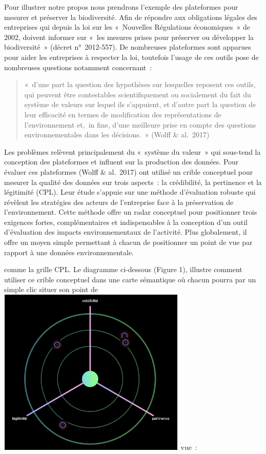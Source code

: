 \documentclass[
  letterpaper,
  DIV=11,
  numbers=noendperiod]{scrreprt}
\begin{document}
Pour illustrer notre propos nous prendrons l'exemple des plateformes
pour mesurer et préserver la biodiversité. Afin de répondre aux
obligations légales des entreprises qui depuis la loi sur les
«~Nouvelles Régulations économiques~» de 2002, doivent informer sur
«~les mesures prises pour préserver ou développer la biodiversité~»
(décret n°~2012-557). De nombreuses plateformes sont apparues pour aider
les entreprises à respecter la loi, toutefois l'usage de ces outils pose
de nombreuses questions notamment concernant~:

\begin{quote}
«~d'une part la question des hypothèses sur lesquelles reposent ces
outils, qui peuvent être contestables scientifiquement ou socialement du
fait du système de valeurs sur lequel ils s'appuient, et d'autre part la
question de leur efficacité en termes de modification des
représentations de l'environnement et,~in fine, d'une meilleure prise en
compte des questions environnementales dans les décisions.~» (Wolff \&
al.~2017)
\end{quote}

Les problèmes relèvent principalement du «~système du valeur~» qui
sous-tend la conception des plateformes et influent sur la production
des données. Pour évaluer ces plateformes (Wolff \& al.~2017) ont
utilisé un crible conceptuel pour mesurer la qualité des données sur
trois aspects~: la crédibilité, la pertinence et la légitimité (CPL).
Leur étude s'appuie sur une méthode d'évaluation robuste qui révèlent
les stratégies des acteurs de l'entreprise face à la préservation de
l'environnement. Cette méthode offre un radar conceptuel pour
positionner trois exigences fortes, complémentaires et indispensables à
la conception d'un outil d'évaluation des impacts environnementaux de
l'activité. Plus globalement, il offre un moyen simple permettant à
chacun de positionner un point de vue par rapport à une données
environnementale.

comme la grille CPL. Le diagramme ci-dessous (Figure 1), illustre
comment utiliser ce crible conceptuel dans une carte sémantique où
chacun pourra par un simple clic situer son point
de\includegraphics[width=8.992cm,height=8.026cm]{media/1000000100000531000004ADCDEC4EC1C68E3B55.png}
vue~:
\end{document}

